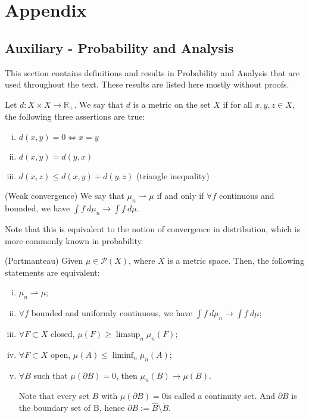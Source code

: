 \newpage
\chapter{Appendix}

\section{Auxiliary - Probability and Analysis}
This section contains definitions and results in Probability and
Analysis that are used throughout the text. These results are listed
here mostly without proofs.

\begin{definition}
	Let $d:X\times X \to \mathbb R_+$. We say that $d$ is a metric on the set $X$ if
	for all $x,y,z \in X$, the following three assertions are true:
	\begin{enumerate}[i)]
		\item $d(x,y) = 0 \iff x = y$
		\item $d(x,y) = d(y,x)$
		\item $d(x,z) \leq d(x,y) + d(y,z)$ (triangle inequality)
	\end{enumerate}
	\label{def:metric}
\end{definition}

\begin{definition}(Weak convergence)
	We say that $\mu_n \rightharpoonup \mu$ if and only if
	$\forall f$ continuous and bounded, we have
	$\int f \ d\mu_n \to \int f \ d\mu$.
	\label{def:weakconv}
\end{definition}
Note that this is equivalent to the notion of convergence in distribution,
which is more commonly known in probability.

\begin{theorem}(Portmanteau)
	\label{Portmanteau}
	Given $\mu \in \mathcal{P}(X)$, where $X$ is a metric space.
	Then, the following statements are equivalent:
	\begin{enumerate}[i)]
		\item $\mu_n \rightharpoonup \mu$;

		\item $\forall f$ bounded and uniformly continuous,
		      we have $\int f \ d\mu_n \to \int f \ d\mu$;

		\item $\forall F \subset X$ closed,
		      $\mu(F) \geq \limsup_n \mu_n(F)$;

		\item $\forall F \subset X$ open,
		      $\mu(A) \leq \liminf_n \mu_n(A)$;

		\item $\forall B$ such that $\mu(\partial B)= 0$, then
		      $\mu_n(B) \to \mu(B)$.

		      Note that every set $B$ with
		      $\mu(\partial B)=0$is called
		      a continuity set. And $\partial B$ is the boundary set of
		      B, hence $\partial B := \hat B \setminus \mathring B$.
	\end{enumerate}

\end{theorem}

